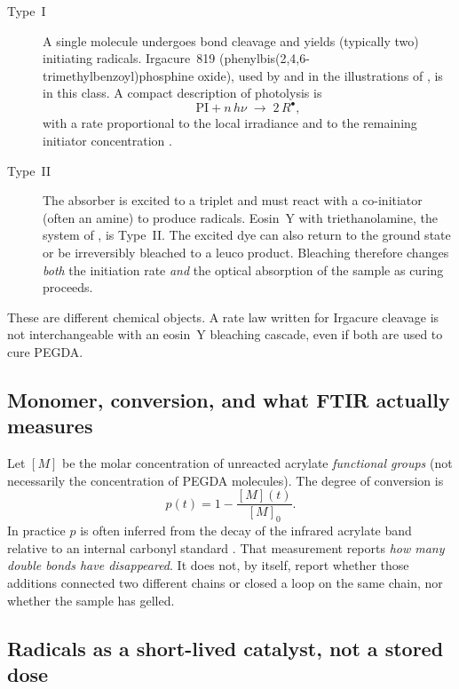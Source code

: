 \documentclass[11pt,a4paper]{article}
\begin{document}
\begin{description}
  \item[Type~I]
    A single molecule undergoes bond cleavage and yields (typically two) initiating radicals.
    Irgacure~819 (phenylbis(2,4,6-trimethylbenzoyl)phosphine oxide), used by \citet{Montgomery2022} and in the illustrations of \citet{Dobson2024}, is in this class.
    A compact description of photolysis is
    \begin{equation}
      \mathrm{PI} + n\,h\nu \;\longrightarrow\; 2\,R^\bullet,
      \label{eq:typeI}
    \end{equation}
    with a rate proportional to the local irradiance and to the remaining initiator concentration \citep{Montgomery2022}.
  \item[Type~II]
    The absorber is excited to a triplet and must react with a co-initiator (often an amine) to produce radicals.
    Eosin~Y with triethanolamine, the system of \citet{Zhu2020}, is Type~II.
    The excited dye can also return to the ground state or be irreversibly bleached to a leuco product.
    Bleaching therefore changes \emph{both} the initiation rate \emph{and} the optical absorption of the sample as curing proceeds.
\end{description}

These are different chemical objects.
A rate law written for Irgacure cleavage is not interchangeable with an eosin~Y bleaching cascade, even if both are used to cure PEGDA.

\subsection{Monomer, conversion, and what FTIR actually measures}

Let $[M]$ be the molar concentration of unreacted acrylate \emph{functional groups} (not necessarily the concentration of PEGDA molecules).
The degree of conversion is
\begin{equation}
  p(t) = 1 - \frac{[M](t)}{[M]_0}.
  \label{eq:conversion}
\end{equation}
In practice $p$ is often inferred from the decay of the infrared acrylate band relative to an internal carbonyl standard \citep{Montgomery2022}.
That measurement reports \emph{how many double bonds have disappeared}.
It does not, by itself, report whether those additions connected two different chains or closed a loop on the same chain, nor whether the sample has gelled.

\subsection{Radicals as a short-lived catalyst, not a stored dose}
\end{document}
